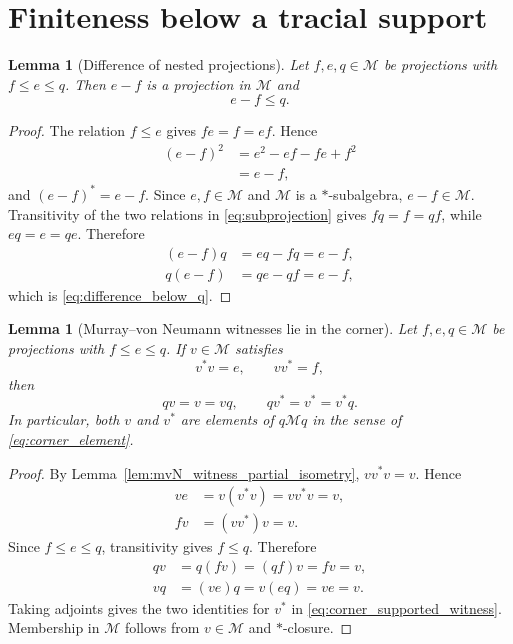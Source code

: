 \documentclass[11pt,reqno]{amsart}
\numberwithin{equation}{section}
\newtheorem{lemma}[theorem]{Lemma}
\theoremstyle{definition}
\theoremstyle{remark}
\newcommand{\cM}{\mathcal M}
\begin{document}
\section{Finiteness below a tracial support}
\label{sec:corner_finiteness}

\begin{lemma}[Difference of nested projections]
\label{lem:projection_difference}
Let $f,e,q\in\cM$ be projections with $f\leq e\leq q$.  Then $e-f$ is a
projection in $\cM$ and
\begin{equation}
  e-f\leq q.
  \label{eq:difference_below_q}
\end{equation}
\end{lemma}

\begin{proof}
The relation $f\leq e$ gives $fe=f=ef$.  Hence
\begin{align}
  (e-f)^2
  &=e^2-ef-fe+f^2 \\
  &=e-f,
  \label{eq:difference_idempotent}
\end{align}
and $(e-f)^*=e-f$.  Since $e,f\in\cM$ and $\cM$ is a $*$-subalgebra,
$e-f\in\cM$.  Transitivity of the two relations in
\eqref{eq:subprojection} gives $fq=f=qf$, while $eq=e=qe$.  Therefore
\begin{align}
  (e-f)q&=eq-fq=e-f,\\
  q(e-f)&=qe-qf=e-f,
  \label{eq:difference_subprojection}
\end{align}
which is \eqref{eq:difference_below_q}.
\end{proof}

\begin{lemma}[Murray--von Neumann witnesses lie in the corner]
\label{lem:mvN_witness_in_corner}
Let $f,e,q\in\cM$ be projections with $f\leq e\leq q$.  If $v\in\cM$
satisfies
\begin{equation}
  v^*v=e,
  \qquad
  vv^*=f,
  \label{eq:corner_mvN_witness}
\end{equation}
then
\begin{equation}
  qv=v=vq,
  \qquad
  qv^*=v^*=v^*q.
  \label{eq:corner_supported_witness}
\end{equation}
In particular, both $v$ and $v^*$ are elements of $q\cM q$ in the sense of
\eqref{eq:corner_element}.
\end{lemma}

\begin{proof}
By Lemma~\ref{lem:mvN_witness_partial_isometry},
$vv^*v=v$.  Hence
\begin{align}
  ve&=v(v^*v)=vv^*v=v,\\
  fv&=(vv^*)v=v.
  \label{eq:initial_final_support_witness}
\end{align}
Since $f\leq e\leq q$, transitivity gives $f\leq q$.  Therefore
\begin{align}
  qv&=q(fv)=(qf)v=fv=v,\\
  vq&=(ve)q=v(eq)=ve=v.
  \label{eq:corner_support_witness}
\end{align}
Taking adjoints gives the two identities for $v^*$ in
\eqref{eq:corner_supported_witness}.  Membership in $\cM$ follows from
$v\in\cM$ and $*$-closure.
\end{proof}
\end{document}
